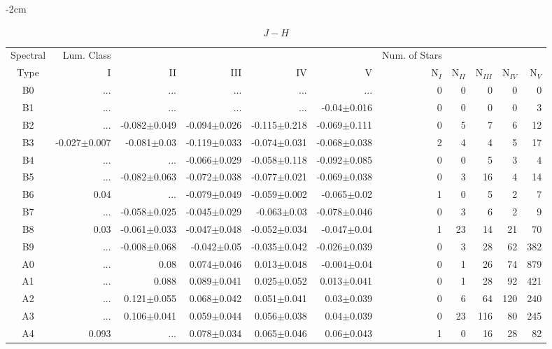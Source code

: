 \begin{table}[t]
\tiny
\centering
\caption{$J-H$}
\begin{center}
    \addtolength{\leftskip} {-2cm}
    \addtolength{\rightskip}{-2cm}
    \begin{tabular}{c|rrrrr|rrrrr}
    \toprule
    Spectral & Lum. Class & & & & & Num. of Stars & & & &  \\
    Type & I & II & III &  IV & V & N$_{I}$ & N$_{II}$ & N$_{III}$ & N$_{IV}$ & N$_{V}$ \\ \midrule

B0	&	 ...	&	 ...	&	 ...	&	 ...	&	 ...	&	0	&	0	&	0	&	0	&	0	\\
B1	&	 ...	&	 ...	&	 ...	&	 ...	&	-0.04$\pm$0.016	&	0	&	0	&	0	&	0	&	3	\\
B2	&	 ...	&	-0.082$\pm$0.049	&	-0.094$\pm$0.026	&	-0.115$\pm$0.218	&	-0.069$\pm$0.111	&	0	&	5	&	7	&	6	&	12	\\
B3	&	-0.027$\pm$0.007	&	-0.081$\pm$0.03	&	-0.119$\pm$0.033	&	-0.074$\pm$0.031	&	-0.068$\pm$0.038	&	2	&	4	&	4	&	5	&	17	\\
B4	&	 ...	&	 ...	&	-0.066$\pm$0.029	&	-0.058$\pm$0.118	&	-0.092$\pm$0.085	&	0	&	0	&	5	&	3	&	4	\\
B5	&	 ...	&	-0.082$\pm$0.063	&	-0.072$\pm$0.038	&	-0.077$\pm$0.021	&	-0.069$\pm$0.038	&	0	&	3	&	16	&	4	&	14	\\
B6	&	0.04	&	 ...	&	-0.079$\pm$0.049	&	-0.059$\pm$0.002	&	-0.065$\pm$0.02	&	1	&	0	&	5	&	2	&	7	\\
B7	&	 ...	&	-0.058$\pm$0.025	&	-0.045$\pm$0.029	&	-0.063$\pm$0.03	&	-0.078$\pm$0.046	&	0	&	3	&	6	&	2	&	9	\\
B8	&	0.03	&	-0.061$\pm$0.033	&	-0.047$\pm$0.048	&	-0.052$\pm$0.034	&	-0.047$\pm$0.04	&	1	&	23	&	14	&	21	&	70	\\
B9	&	 ...	&	-0.008$\pm$0.068	&	-0.042$\pm$0.05	&	-0.035$\pm$0.042	&	-0.026$\pm$0.039	&	0	&	3	&	28	&	62	&	382	\\
A0	&	 ...	&	0.08	&	0.074$\pm$0.046	&	0.013$\pm$0.048	&	-0.004$\pm$0.04	&	0	&	1	&	26	&	74	&	879	\\
A1	&	 ...	&	0.088	&	0.089$\pm$0.041	&	0.025$\pm$0.052	&	0.013$\pm$0.041	&	0	&	1	&	28	&	92	&	421	\\
A2	&	 ...	&	0.121$\pm$0.055	&	0.068$\pm$0.042	&	0.051$\pm$0.041	&	0.03$\pm$0.039	&	0	&	6	&	64	&	120	&	240	\\
A3	&	 ...	&	0.106$\pm$0.041	&	0.059$\pm$0.044	&	0.056$\pm$0.038	&	0.04$\pm$0.039	&	0	&	23	&	116	&	80	&	245	\\
A4	&	0.093	&	 ...	&	0.078$\pm$0.034	&	0.065$\pm$0.046	&	0.06$\pm$0.043	&	1	&	0	&	16	&	28	&	82	\\

\end{tabular}
\end{center}
\end{table}
